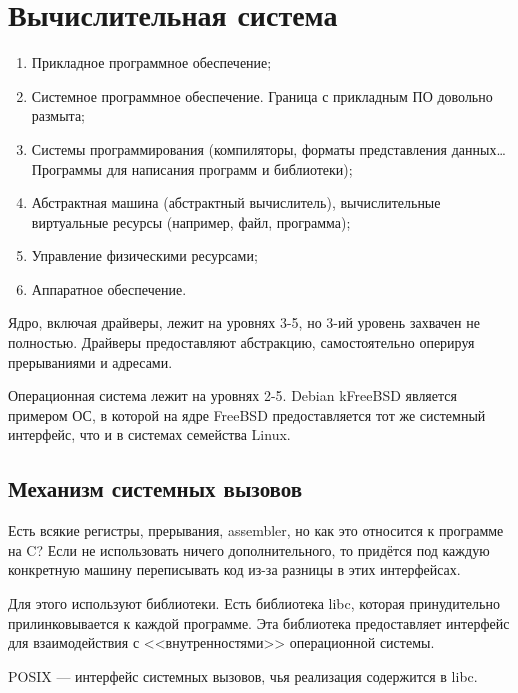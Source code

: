 \section{Вычислительная система}

\begin{enumerate}
\item Прикладное программное обеспечение;
\item Системное программное обеспечение. Граница с прикладным ПО довольно размыта;
\item Системы программирования (компиляторы, форматы представления данных\dots\newline Программы для написания программ и библиотеки);
\item Абстрактная машина (абстрактный вычислитель), вычислительные виртуальные ресурсы (например, файл, программа);
\item Управление физическими ресурсами;
\item Аппаратное обеспечение.

\end{enumerate}

Ядро, включая драйверы, лежит на уровнях 3-5, но 3-ий уровень захвачен не полностью. Драйверы предоставляют абстракцию, самостоятельно оперируя прерываниями и адресами.

Операционная система лежит на уровнях 2-5. Debian kFreeBSD является примером ОС, в которой на ядре FreeBSD предоставляется тот же системный интерфейс, что и в системах семейства Linux.

\subsection*{Механизм системных вызовов}
Есть всякие регистры, прерывания, assembler, но как это относится к программе на C? Если не использовать ничего дополнительного, то придётся под каждую конкретную машину переписывать код из-за разницы в этих интерфейсах. 

Для этого используют библиотеки. Есть библиотека libc, которая принудительно прилинковывается к каждой программе. Эта библиотека предоставляет интерфейс для взаимодействия с <<внутренностями>> операционной системы.

POSIX --- интерфейс системных вызовов, чья реализация содержится в libc. 
